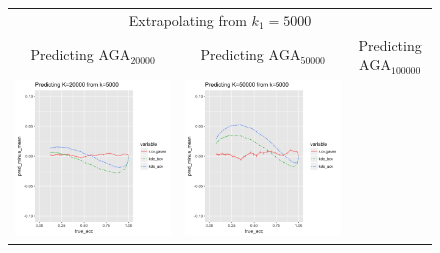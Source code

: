 \documentclass[twoside,11pt]{article}
\newenvironment{myfont}{\fontfamily{phv}\selectfont}{\par}
\begin{document}
\begin{figure}
\begin{tabular}{ccc}
\multicolumn{3}{c}{\begin{myfont}Extrapolating from $k_1 = 5000$\end{myfont}}\\
\begin{myfont}Predicting $\text{AGA}_{20000}$\end{myfont} &
\begin{myfont}Predicting $\text{AGA}_{50000}$\end{myfont} &
\begin{myfont}Predicting $\text{AGA}_{100000}$\end{myfont}\\
\includegraphics[scale = 0.45, clip = true, trim = .22in 0 1.23in 0.4in]{sim_large7_biaz_K20_k5.png} &
\includegraphics[scale = 0.45, clip = true, trim = .3in 0 1.23in 0.4in]{sim_large7_biaz_K50_k5.png} &

\end{tabular}
\end{figure}
\end{document}
